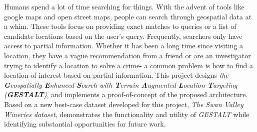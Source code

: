 Humans spend a lot of time searching for things. 
With the advent of tools like google maps and open street maps, people can search through geospatial data at a whim. 
These tools focus on providing exact matches to queries or a list of candidate locations based on the user's query. 
Frequently, searchers only have access to partial information. 
Whether it has been a long time since visiting a location, they have a vague recommendation from a friend or are an investigator trying to identify a location to solve a crime- a common problem is how to find a location of interest based on partial information. 
This project designs \textit{the \textbf{G}eospatially \textbf{E}nhanced \textbf{S}earch with \textbf{T}errain \textbf{A}ugmented \textbf{L}ocation \textbf{T}argeting (\textbf{GESTALT})}, and implements a proof-of-concept of the proposed architecture. 
Based on a new best-case dataset developed for this project, \textit{The Swan Valley Wineries dataset}, demonstrates the functionality and utility of \textit{GESTALT} while identifying substantial opportunities for future work. 